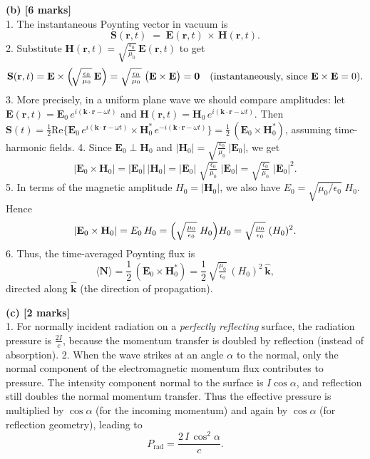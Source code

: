 \documentclass{article}
\begin{document}
\bigskip
\noindent
\textbf{(b) [6 marks]}\\
1.\; The instantaneous Poynting vector in vacuum is
\[
\mathbf{S}(\mathbf{r},t) \;=\; \mathbf{E}(\mathbf{r},t)\,\times\,\mathbf{H}(\mathbf{r},t).
\]
2.\; Substitute 
\(\mathbf{H}(\mathbf{r},t) = \sqrt{\frac{\epsilon_0}{\mu_0}}\,\mathbf{E}(\mathbf{r},t)\)
to get
\[
\mathbf{S}(\mathbf{r},t) 
= \mathbf{E}\times \Bigl(\!\sqrt{\tfrac{\epsilon_0}{\mu_0}}\,\mathbf{E}\Bigr) 
= \sqrt{\tfrac{\epsilon_0}{\mu_0}}\;\bigl(\mathbf{E}\times \mathbf{E}\bigr) 
= \mathbf{0}
\quad \text{(instantaneously, since } \mathbf{E}\times\mathbf{E}=0 \text{).}
\]
3.\; More precisely, in a uniform plane wave we should compare amplitudes: let
\(\mathbf{E}(\mathbf{r},t) = \mathbf{E}_0\,e^{i(\mathbf{k}\cdot\mathbf{r}-\omega t)}\)
and 
\(\mathbf{H}(\mathbf{r},t) = \mathbf{H}_0\,e^{i(\mathbf{k}\cdot\mathbf{r}-\omega t)}\).
Then 
\(\mathbf{S}(t) = \frac12 \mathrm{Re}\{\mathbf{E}_0\,e^{i(\mathbf{k}\cdot\mathbf{r}-\omega t)} \times \mathbf{H}_0^*\,e^{-i(\mathbf{k}\cdot\mathbf{r}-\omega t)}\} = \tfrac12\,(\mathbf{E}_0 \times \mathbf{H}_0^*)\),
assuming time-harmonic fields.
4.\; Since \(\mathbf{E}_0 \perp \mathbf{H}_0\) and \(|\mathbf{H}_0| = \sqrt{\frac{\epsilon_0}{\mu_0}}\,|\mathbf{E}_0|\), we get
\[
|\mathbf{E}_0 \times \mathbf{H}_0| 
= |\mathbf{E}_0|\,|\mathbf{H}_0|
= |\mathbf{E}_0|\;\sqrt{\tfrac{\epsilon_0}{\mu_0}}\;|\mathbf{E}_0|
= \sqrt{\tfrac{\epsilon_0}{\mu_0}}\;|\mathbf{E}_0|^2.
\]
5.\; In terms of the magnetic amplitude \(H_0 = |\mathbf{H}_0|\), we also have
\(E_0 = \sqrt{\mu_0/\epsilon_0}\;H_0.\)
Hence
\[
|\mathbf{E}_0 \times \mathbf{H}_0| 
= E_0\,H_0
= \Bigl(\sqrt{\tfrac{\mu_0}{\epsilon_0}}\;H_0\Bigr)H_0
= \sqrt{\tfrac{\mu_0}{\epsilon_0}}\;(H_0)^2.
\]
6.\; Thus, the time-averaged Poynting flux is
\[
\langle \mathbf{N} \rangle 
= \frac12\,(\mathbf{E}_0 \times \mathbf{H}_0^*)
= \frac12\,\sqrt{\tfrac{\mu_0}{\epsilon_0}}\,(H_0)^2\,\hat{\mathbf{k}},
\]
directed along \(\hat{\mathbf{k}}\) (the direction of propagation).

\bigskip
\noindent
\textbf{(c) [2 marks]}\\
1.\; For normally incident radiation on a \emph{perfectly reflecting} surface, the radiation pressure is \(\tfrac{2I}{c}\), because the momentum transfer is doubled by reflection (instead of absorption).
2.\; When the wave strikes at an angle \(\alpha\) to the normal, only the normal component of the electromagnetic momentum flux contributes to pressure. The intensity component normal to the surface is \(I\cos\alpha\), and reflection still doubles the normal momentum transfer. Thus the effective pressure is multiplied by \(\cos\alpha\) (for the incoming momentum) and again by \(\cos\alpha\) (for reflection geometry), leading to
\[
P_{\mathrm{rad}} 
= \frac{2\,I\,\cos^2\alpha}{c}.
\]
\end{document}
